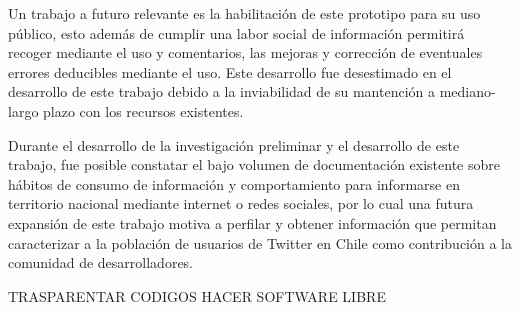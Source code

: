 Un trabajo a futuro relevante es la habilitación de este prototipo para su uso público, esto además de cumplir una labor social de información permitirá recoger mediante el uso y comentarios, las mejoras y corrección de eventuales errores deducibles mediante el uso. Este desarrollo fue desestimado en el desarrollo de este trabajo debido a la inviabilidad de su mantención a mediano-largo plazo con los recursos existentes.
	
Durante el desarrollo de la investigación preliminar y el desarrollo de este trabajo, fue posible constatar el bajo volumen de documentación existente sobre hábitos de consumo de información y comportamiento para informarse en territorio nacional mediante internet o redes sociales, por lo cual una futura expansión de este trabajo motiva a perfilar y obtener información que permitan caracterizar a la población de usuarios de Twitter en Chile como contribución a la comunidad de desarrolladores.

TRASPARENTAR CODIGOS
HACER SOFTWARE LIBRE
	
	
	

	
